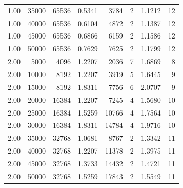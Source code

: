 \documentclass{article}
\begin{document}
\begin{table}[h]
\begin{tabular}{|r|r|r|r|r|r|r|r|}
1.00 & 35000 & 65536  & 0.5341 & 3784  & 2 & 1.1212 & 12 \\
1.00 & 40000 & 65536  & 0.6104 & 4872  & 2 & 1.1387 & 12 \\
1.00 & 45000 & 65536  & 0.6866 & 6159  & 2 & 1.1586 & 12 \\
1.00 & 50000 & 65536  & 0.7629 & 7625  & 2 & 1.1799 & 12 \\
\hline
2.00 & 5000  & 4096   & 1.2207 & 2036  & 7 & 1.6869 & 8  \\
2.00 & 10000 & 8192   & 1.2207 & 3919  & 5 & 1.6445 & 9  \\
2.00 & 15000 & 8192   & 1.8311 & 7756  & 6 & 2.0707 & 9  \\
2.00 & 20000 & 16384  & 1.2207 & 7245  & 4 & 1.5680 & 10 \\
2.00 & 25000 & 16384  & 1.5259 & 10766 & 4 & 1.7564 & 10 \\
2.00 & 30000 & 16384  & 1.8311 & 14784 & 4 & 1.9716 & 10 \\
2.00 & 35000 & 32768  & 1.0681 & 8767  & 2 & 1.3342 & 11 \\
2.00 & 40000 & 32768  & 1.2207 & 11378 & 2 & 1.3975 & 11 \\
2.00 & 45000 & 32768  & 1.3733 & 14432 & 2 & 1.4721 & 11 \\
2.00 & 50000 & 32768  & 1.5259 & 17843 & 2 & 1.5549 & 11 \\
\hline
\end{tabular}
\end{table}
\end{document}
